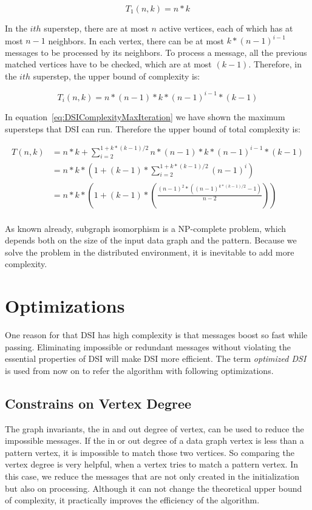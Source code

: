 \begin{equation}\label{eq:DSIComplexityInitial}
	T_1(n,k) = n*k
\end{equation}

In the $ith$ superstep, there are at most $n$ active vertices, each of which has at most $n-1$ neighbors. In each vertex, there can be at most $k*(n-1)^{i-1}$ messages to be processed by its neighbors. To process a message, all the previous matched vertices have to be checked, which are at most $(k-1)$. Therefore, in the $ith$ superstep, the upper bound of complexity is:

\begin{equation}\label{eq:DSIComplexityIth}
	T_i(n,k) = n*(n-1)*k*(n-1)^{i-1}*(k-1)
\end{equation}

In equation~\ref{eq:DSIComplexityMaxIteration} we have shown the maximum supersteps that DSI can run. Therefore the upper bound of total complexity is:

\begin{equation} \label{eq:DSIComplexityTotal}
	\begin{split}
		T(n,k) &= n*k + \sum_{i=2}^{1+k*(k-1)/2} n*(n-1)*k*(n-1)^{i-1}*(k-1)\\
		&= n*k*(1+(k-1)*\sum_{i=2}^{1+k*(k-1)/2} (n-1)^{i})\\
		&= n*k*(1+(k-1)*(\frac{(n-1)^2*((n-1)^{k*(k-1)/2}-1)}{n-2}))\\
	\end{split}
\end{equation}

As known already, subgraph isomorphism is a NP-complete problem, which depends both on the size of the input data graph and the pattern. Because we solve the problem in the distributed environment, it is inevitable to add more complexity.

\section{Optimizations}

One reason for that DSI has high complexity is that messages boost so fast while passing. Eliminating impossible or redundant messages without violating the essential properties of DSI will make DSI more efficient. The term \textit{optimized DSI} is used from now on to refer the algorithm with following optimizations.

\subsection{Constrains on Vertex Degree}
The graph invariants, the in and out degree of vertex, can be used to reduce the impossible messages. If the in or out degree of a data graph vertex is less than a pattern vertex, it is impossible to match those two vertices. So comparing the vertex degree is very helpful, when a vertex tries to match a pattern vertex. In this case, we reduce the messages that are not only created in the initialization but also on processing. Although it can not change the theoretical upper bound of complexity, it practically improves the efficiency of the algorithm.

